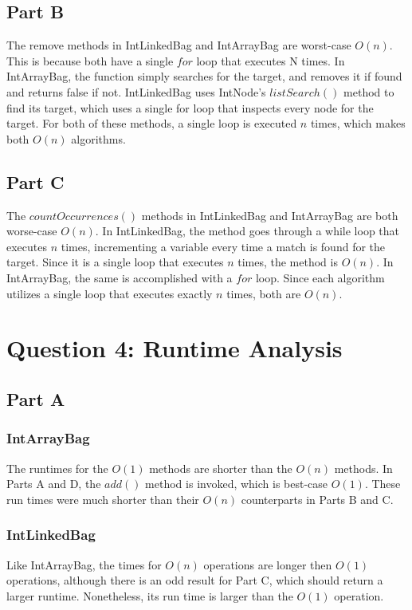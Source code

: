 \documentclass[12pt]{article} %
\begin{document}
\subsection{Part B}
The remove methods in IntLinkedBag and IntArrayBag are worst-case $O(n)$. This is because both have a single $for$ loop that executes N times. In IntArrayBag, the function simply searches for the target, and removes it if found and returns false if not. IntLinkedBag uses IntNode’s $listSearch()$ method to find its target, which uses a single for loop that inspects every node for the target. For both of these methods, a single loop is executed $n$ times, which makes both $O(n)$ algorithms. 

\subsection{Part C}
The $countOccurrences() $ methods in IntLinkedBag and IntArrayBag are both worse-case $O(n)$. In IntLinkedBag, the method goes through a while loop that executes $n$ times, incrementing a variable every time a match is found for the target. Since it is a single loop that executes $n$ times, the method is $O(n)$. In IntArrayBag, the same is accomplished with a $for$ loop. Since each algorithm utilizes a single loop that executes exactly $n$ times, both are $O(n)$.

\section{Question 4: Runtime Analysis}
\subsection{Part A}
\subsubsection{IntArrayBag}
The runtimes for the $O(1)$ methods are shorter than the $O(n)$ methods. In Parts A and D, the $add()$ method is invoked, which is best-case $O(1)$. These run times were much shorter than their $O(n)$ counterparts in Parts B and C.
\subsubsection{IntLinkedBag}
Like IntArrayBag, the times for $O(n)$ operations are longer then $O(1)$ operations, although there is an odd result for Part C, which should return a larger runtime. Nonetheless, its run time is larger than the $O(1)$ operation. 
\end{document}
